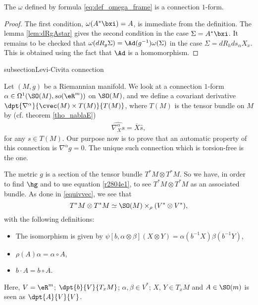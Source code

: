 \begin{proposition}
The $\omega$ defined by formula \eqref{eq:def_omega_frame} is a connection $1$-form.
\label{prop_omconfrom}
\end{proposition}

\begin{proof}
The first condition, $\omega(A^*\bxi)=A$, is immediate from the definition. The lemma \ref{lem:dRgAstar} gives the second condition in the case $\Sigma=A^*\bxi$. It remains to be checked that $\omega(dR_g\Sigma)=\Ad(g^{-1})\omega(\Sigma)$ in the case $\Sigma=dR_hds_{\alpha} X_x$. This is obtained using the fact that $\Ad$ is a homomorphism.
\end{proof}

subsection{Levi-Civita connection}\label{subsection_levi}

Let $(M,g)$ be a Riemannian manifold. We look at a connection $1$-form $\alpha\in\Omega^1(\SO(M),so(\eR^m))$ on $\SO(M)$, and we define a covariant derivative $\dpt{\nabla^{\alpha}}{\cvec(M)\times T(M)}{T(M)}$, where $T(M)$ is the tensor bundle on $M$ by (cf. theorem \eqref{tho_nablaE})
\begin{eqnarray}\label{r2804e1}
 \widehat{\nabla^{\alpha}_X s}=\overline{X}\hat{s},
\end{eqnarray}
for any $s\in T(M)$.  Our purpose now is to prove that an automatic property of this connection is $\nabla^{\alpha} g=0$. The unique such connection which is torsion-free is the  one.

The metric $g$ is a section of the tensor bundle $T^*M\otimes T^*M$. So we have, in order to find $\hg$ and to use equation \eqref{r2804e1}, to see $T^*M\otimes T^*M$ as an associated bundle. As done in \ref{equivvec}, we see that
\[
 T^*M\otimes T^*M\simeq \SO(M)\times_{\rho}(V^*\otimes V^*),
\]
with the following definitions:
\begin{itemize}
\item The isomorphism is given by $\psi[b,\alpha\otimes\beta](X\otimes Y)=\alpha(b^{-1} X)\beta(b^{-1} Y)$,
\item $\rho(A)\alpha=\alpha\circ A$,
\item $b\cdot A=b\circ A$.
\end{itemize}
Here, $V=\eR^m$; $\dpt{b}{V}{T_xM}$; $\alpha,\beta\in V^*$; $X$, $Y\in T_xM$ and $A\in \SO(m)$ is seen as $\dpt{A}{V}{V}$.

